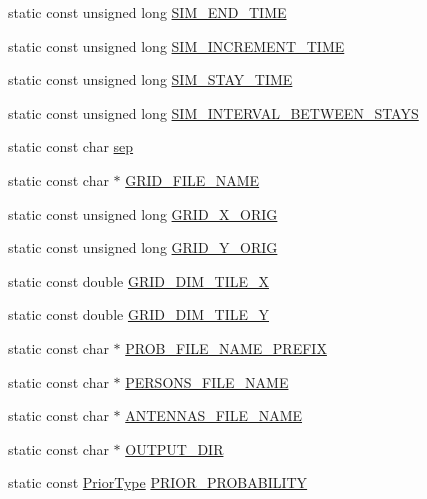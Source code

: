 \begin{DoxyCompactItemize}
\item 
static const unsigned long \hyperlink{class_constants_affb253c69b40f5979cd07383245331b7}{S\+I\+M\+\_\+\+E\+N\+D\+\_\+\+T\+I\+ME}
\item 
static const unsigned long \hyperlink{class_constants_ae689749614ecdd38b50a014400138bc2}{S\+I\+M\+\_\+\+I\+N\+C\+R\+E\+M\+E\+N\+T\+\_\+\+T\+I\+ME}
\item 
static const unsigned long \hyperlink{class_constants_a885a54aa8b2d13632ae3e8ff8e7664fb}{S\+I\+M\+\_\+\+S\+T\+A\+Y\+\_\+\+T\+I\+ME}
\item 
static const unsigned long \hyperlink{class_constants_a396cc1e9abbdf0a536886ebfd6b28045}{S\+I\+M\+\_\+\+I\+N\+T\+E\+R\+V\+A\+L\+\_\+\+B\+E\+T\+W\+E\+E\+N\+\_\+\+S\+T\+A\+YS}
\item 
static const char \hyperlink{class_constants_afc927f63cc5fbb912114d6b0f28b8b4f}{sep}
\item 
static const char $\ast$ \hyperlink{class_constants_aa2fd1c5551c8dab10dc1bd4c0cd0db8f}{G\+R\+I\+D\+\_\+\+F\+I\+L\+E\+\_\+\+N\+A\+ME}
\item 
static const unsigned long \hyperlink{class_constants_ac09062322e1ab9b6e1ca3a568b11c376}{G\+R\+I\+D\+\_\+\+X\+\_\+\+O\+R\+IG}
\item 
static const unsigned long \hyperlink{class_constants_ace48b30468931aaf452ab7a6daf573e0}{G\+R\+I\+D\+\_\+\+Y\+\_\+\+O\+R\+IG}
\item 
static const double \hyperlink{class_constants_a4400d3f97fa2e2be6091a8005efedd7f}{G\+R\+I\+D\+\_\+\+D\+I\+M\+\_\+\+T\+I\+L\+E\+\_\+X}
\item 
static const double \hyperlink{class_constants_a08f9273d844b68a74fd979d5a46d4918}{G\+R\+I\+D\+\_\+\+D\+I\+M\+\_\+\+T\+I\+L\+E\+\_\+Y}
\item 
static const char $\ast$ \hyperlink{class_constants_a3b2d3fc0ccc4636a51190bf5b297d72d}{P\+R\+O\+B\+\_\+\+F\+I\+L\+E\+\_\+\+N\+A\+M\+E\+\_\+\+P\+R\+E\+F\+IX}
\item 
static const char $\ast$ \hyperlink{class_constants_a2388516c40960223c0aef1610fd72312}{P\+E\+R\+S\+O\+N\+S\+\_\+\+F\+I\+L\+E\+\_\+\+N\+A\+ME}
\item 
static const char $\ast$ \hyperlink{class_constants_a23f758b23b88c7cfe23b278647671acb}{A\+N\+T\+E\+N\+N\+A\+S\+\_\+\+F\+I\+L\+E\+\_\+\+N\+A\+ME}
\item 
static const char $\ast$ \hyperlink{class_constants_a91fc37386abce571a0c7cd3f1b4b47c3}{O\+U\+T\+P\+U\+T\+\_\+\+D\+IR}
\item 
static const \hyperlink{_prior_type_8h_a61286c562e68de246982fc393a7c23a5}{Prior\+Type} \hyperlink{class_constants_a7b31976adc7ad0f3dbed86b205e1773d}{P\+R\+I\+O\+R\+\_\+\+P\+R\+O\+B\+A\+B\+I\+L\+I\+TY}

\end{DoxyCompactItemize}
